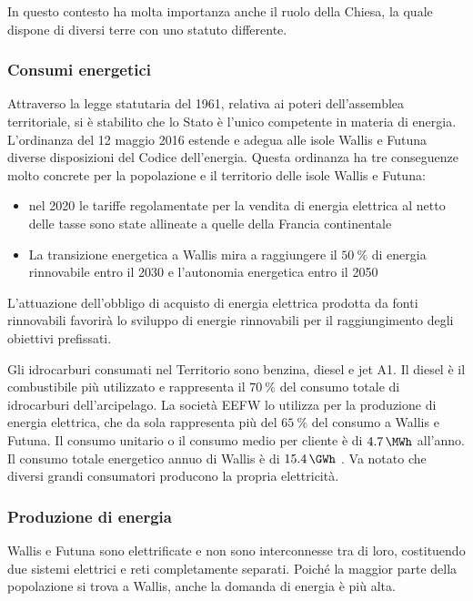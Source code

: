 \documentclass[fleqn,11pt]{SelfArx} %
\begin{document}
In questo contesto ha molta importanza anche il ruolo della Chiesa, la quale dispone di diversi terre con uno statuto differente.

\subsubsection{Consumi energetici}
Attraverso la legge statutaria del 1961, relativa ai poteri dell'assemblea territoriale, si è stabilito che lo Stato è l'unico competente in materia di energia.
L'ordinanza del 12 maggio 2016 estende e adegua alle isole Wallis e Futuna diverse disposizioni del Codice dell'energia.
Questa ordinanza ha tre conseguenze molto concrete per la popolazione e il territorio delle isole Wallis e Futuna:
\begin{itemize}
	\item nel 2020 le tariffe regolamentate per la vendita di energia elettrica al netto delle tasse sono state allineate a quelle della Francia continentale
	\item La transizione energetica a Wallis mira a raggiungere il \(\SI{50}{\percent}\) di energia rinnovabile entro il 2030 e l'autonomia energetica entro il 2050
\end{itemize}
L'attuazione dell'obbligo di acquisto di energia elettrica prodotta da fonti rinnovabili favorirà lo sviluppo di energie rinnovabili per il raggiungimento degli obiettivi prefissati. 

Gli idrocarburi consumati nel Territorio sono benzina, diesel e jet A1. 
Il diesel è il combustibile più utilizzato e rappresenta il \(\SI{70}{\percent}\) del consumo totale di idrocarburi dell'arcipelago. 
La società EEFW lo utilizza per la produzione di energia elettrica, che da sola rappresenta più del \(\SI{65}{\percent}\) del consumo a Wallis e Futuna.
Il consumo unitario o il consumo medio per cliente è di \(\SI{4.7}{\MWh}\) all'anno.
Il consumo totale energetico annuo di Wallis è di \(\SI{15.4}{\GWh}\) \cite{MagicFrenchDoc}.
Va notato che diversi grandi consumatori producono la propria elettricità.

\subsubsection{Produzione di energia}
Wallis e Futuna sono elettrificate e non sono interconnesse tra di loro, costituendo due sistemi elettrici e reti completamente separati.
Poiché la maggior parte della popolazione si trova a Wallis, anche la domanda di energia è più alta.
\end{document}
